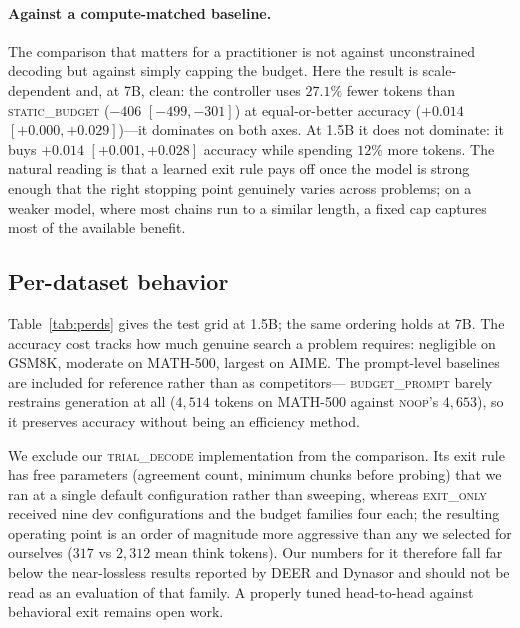 \paragraph{Against a compute-matched baseline.} The comparison that matters
for a practitioner is not against unconstrained decoding but against simply
capping the budget. Here the result is scale-dependent and, at 7B, clean:
the controller uses $27.1\%$ fewer tokens than \textsc{static\_budget}
($-406$ $[-499,-301]$) at equal-or-better accuracy ($+0.014$
$[+0.000,+0.029]$)---it dominates on both axes. At 1.5B it does not dominate:
it buys $+0.014$ $[+0.001,+0.028]$ accuracy while spending $12\%$ more tokens.
The natural reading is that a learned exit rule pays off once the model is
strong enough that the right stopping point genuinely varies across problems;
on a weaker model, where most chains run to a similar length, a fixed cap
captures most of the available benefit.

\subsection{Per-dataset behavior}

Table~\ref{tab:perds} gives the test grid at 1.5B; the same ordering holds at
7B. The accuracy cost tracks how much genuine search a problem requires:
negligible on GSM8K, moderate on MATH-500, largest on AIME. The prompt-level
baselines are included for reference rather than as competitors---
\textsc{budget\_prompt} barely restrains generation at all ($4{,}514$ tokens
on MATH-500 against \textsc{noop}'s $4{,}653$), so it preserves accuracy
without being an efficiency method.

We exclude our \textsc{trial\_decode} implementation from the comparison. Its
exit rule has free parameters (agreement count, minimum chunks before probing)
that we ran at a single default configuration rather than sweeping, whereas
\textsc{exit\_only} received nine dev configurations and the budget families
four each; the resulting operating point is an order of magnitude more
aggressive than any we selected for ourselves ($317$ vs $2{,}312$ mean think
tokens). Our numbers for it therefore fall far below the near-lossless results
reported by DEER \cite{deer} and Dynasor \cite{dynasor} and should not be read
as an evaluation of that family. A properly tuned head-to-head against
behavioral exit remains open work.

